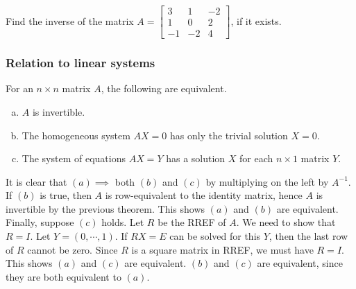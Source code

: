 \documentclass[12pt,letterpaper,reqno]{article}
\numberwithin{equation}{section}
\newcommand{\fixme}[1]{{\color{orange}{[#1]}}}
\begin{document}
\begin{exercise}
Find the inverse of the matrix $A=\begin{bmatrix}
	3 & 1 & -2 \\ 1 & 0 & 2 \\ -1 & -2 & 4
\end{bmatrix}$, if it exists.	
\end{exercise}

\fixme{Include the determinants of $2\times 2$ and $3 \times 3$ matrices in this section and have a section on theory of determinant functions later?}

\subsubsection{Relation to linear systems}

\begin{thm} \label{thm:solution_sets_n_equations_n_unknowns}
		For an $n \times n$ matrix $A$, the following are equivalent.
	\begin{enumerate}[(a)]
		\item $A$ is invertible.
		\item The homogeneous system $AX=0$ has only the trivial solution $X=0$.
		\item The system of equations $AX=Y$ has a solution $X$ for each $n \times 1$ matrix $Y$.
	\end{enumerate}
\end{thm}

\begin{pf}
It is clear that $(a) \implies $ both $(b)$ and $(c)$ by multiplying on the left by $A^{-1}$. If $(b)$ is true, then $A$ is row-equivalent to the identity matrix, hence $A$ is invertible by the previous theorem. This shows $(a)$ and $(b)$ are equivalent. Finally, suppose $(c)$ holds. Let $R$ be the RREF of $A$. We need to show that $R=I$. Let $Y=(0,\cdots,1)$. If $RX=E$ can be solved for this $Y$, then the last row of $R$ cannot be zero. Since $R$ is a square matrix in RREF, we must have $R=I$. This shows $(a)$ and $(c)$ are equivalent. $(b)$ and $(c)$ are equivalent, since they are both equivalent to $(a)$.	
\end{pf}
\end{document}
